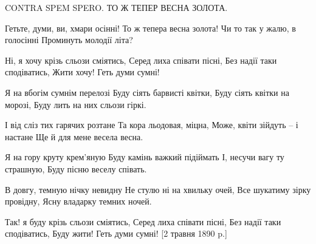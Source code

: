 
 
 
 
 
CONTRA SPEM SPERO. ТО Ж ТЕПЕР ВЕСНА ЗОЛОТА.

Гетьте, думи, ви, хмари осінні!
То ж тепера весна золота!
Чи то так у жалю, в голосінні
Проминуть молодії літа?

Ні, я хочу крізь сльози сміятись,
Серед лиха співати пісні,
Без надії таки сподіватись,
Жити хочу! Геть думи сумні!

Я на вбогім сумнім перелозі
Буду сіять барвисті квітки,
Буду сіять квітки на морозі,
Буду лить на них сльози гіркі.

І від сліз тих гарячих розтане
Та кора льодовая, міцна,
Може, квіти зійдуть – і настане
Ще й для мене весела весна.

Я на гору круту крем’яную
Буду камінь важкий підіймать
І, несучи вагу ту страшную,
Буду пісню веселу співать.

В довгу, темную нічку невидну
Не стулю ні на хвильку очей,
Все шукатиму зірку провідну,
Ясну владарку темних ночей.

Так! я буду крізь сльози сміятись,
Серед лиха співати пісні,
Без надії таки сподіватись,
Буду жити! Геть думи сумні! [2 травня 1890 p.]
